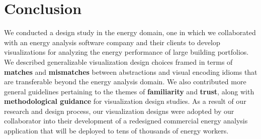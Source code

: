 \documentclass[journal]{vgtc}                %
\newcommand{\tm}[1]{\textcolor{red}{#1}}
\begin{document}

\section{Conclusion}
\label{conclusion}


We conducted a design study in the energy domain, one in which we collaborated with an energy analysis software company and their clients to develop visualizations for analyzing the energy performance of large building portfolios.
We described generalizable visualization design choices framed in terms of {\bf matches} and {\bf mismatches} between abstractions and visual encoding idioms that are transferable beyond the energy analysis domain.
We also contributed more general guidelines pertaining to the themes of {\bf familiarity} and {\bf trust}, along with {\bf methodological guidance} for visualization design studies. %
As a result of our research and design process, our visualization designs were adopted by our collaborator into their development of a redesigned commercial energy analysis application that will be deployed to tens of thousands of energy workers.





\end{document}

